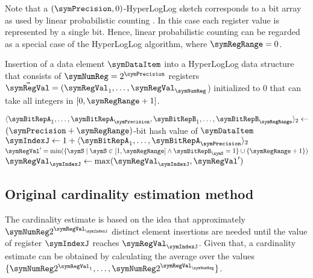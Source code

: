 \documentclass[11pt]{article} %
\begin{document}
Note that a $(\symPrecision, 0)$-HyperLogLog sketch corresponds to a bit array as used by linear probabilistic counting \cite{Whang1990}. In this case each register value is represented by a single bit. Hence, linear probabilistic counting can be regarded as a special case of the HyperLogLog algorithm, where $\symRegRange = 0$.

\begin{algorithm}
\caption{Insertion of a data element $\symDataItem$ into a HyperLogLog data structure that consists of $\symNumReg=2^\symPrecision$ registers $\vec{\symRegVal} = (\symRegVal_1,\ldots,\symRegVal_\symNumReg$) initialized to 0 that can take all integers in $[0, \symRegRange+1]$.}
\label{alg:insert}
\begin{algorithmic}
\State $\langle \symBitRepA_1, \ldots, \symBitRepA_\symPrecision,\symBitRepB_1,\ldots,\symBitRepB_\symRegRange\rangle_2 \gets$ $(\symPrecision + \symRegRange)$-bit hash value of $\symDataItem$
\State $\symIndexJ \gets 1+ \langle \symBitRepA_1, \ldots, \symBitRepA_\symPrecision\rangle_2$
\State $\symRegVal' = \min(\{\symS\mid \symS \in [1, \symRegRange]  \wedge  \symBitRepB_\symS = 1\}\cup {\{\symRegRange+1\}} )$
\State $\symRegVal_\symIndexJ \gets\max(\symRegVal_\symIndexJ, \symRegVal')$
\EndProcedure
\end{algorithmic}
\end{algorithm}

\subsection{Original cardinality estimation method}
The cardinality estimate is based on the idea that approximately $\symNumReg  2^{\symRegVal_\symIndexJ}$ distinct element insertions are needed until the value of register $\symIndexJ$ reaches $\symRegVal_\symIndexJ$. Given that, a cardinality estimate can be obtained by calculating the average over the values $\lbrace \symNumReg 2^{\symRegVal_1},\ldots,\symNumReg2^{\symRegVal_\symNumReg}\rbrace$. 
\end{document}
